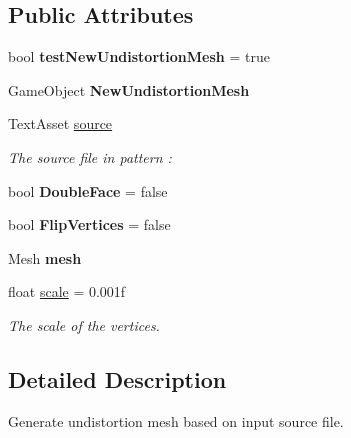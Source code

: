 \subsection*{Public Attributes}
\begin{DoxyCompactItemize}
\item 
\mbox{\label{class_ximmerse_1_1_undistortion_mesh_generator_tool_acd257a0586b424b6b9d7d0cca21a0462}} 
bool {\bfseries test\+New\+Undistortion\+Mesh} = true
\item 
\mbox{\label{class_ximmerse_1_1_undistortion_mesh_generator_tool_a2737ded58eb84229598497058d837987}} 
Game\+Object {\bfseries New\+Undistortion\+Mesh}
\item 
Text\+Asset \mbox{\hyperlink{class_ximmerse_1_1_undistortion_mesh_generator_tool_a8f1e6a84db20799ccc581f2d95597349}{source}}
\begin{DoxyCompactList}\small\item\em The source file in pattern \+: \end{DoxyCompactList}\item 
\mbox{\label{class_ximmerse_1_1_undistortion_mesh_generator_tool_a8e670298c0f1357222113321fb706bcd}} 
bool {\bfseries Double\+Face} = false
\item 
\mbox{\label{class_ximmerse_1_1_undistortion_mesh_generator_tool_afa45ede3e6379d0db6b19904eb27387c}} 
bool {\bfseries Flip\+Vertices} = false
\item 
\mbox{\label{class_ximmerse_1_1_undistortion_mesh_generator_tool_a081242d2c1147d123a19fc9d2eb9f427}} 
Mesh {\bfseries mesh}
\item 
float \mbox{\hyperlink{class_ximmerse_1_1_undistortion_mesh_generator_tool_aa6c18c162391d404d2812431d6e1a9c5}{scale}} = 0.\+001f
\begin{DoxyCompactList}\small\item\em The scale of the vertices. \end{DoxyCompactList}\end{DoxyCompactItemize}


\subsection{Detailed Description}
Generate undistortion mesh based on input source file. 



